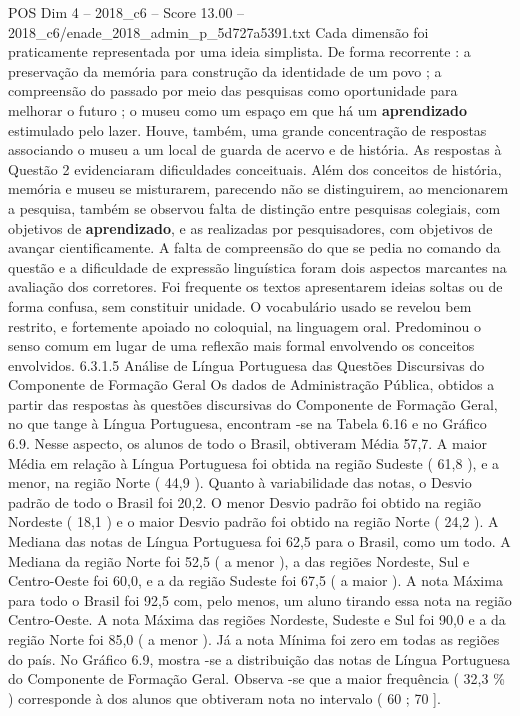 \begin{textsample}{POS Dim 4 – 2018\_c6 – Score 13.00 – 2018\_c6/enade\_2018\_admin\_p\_5d727a5391.txt}
Cada dimensão foi praticamente representada por uma ideia simplista.
De forma recorrente : a preservação da memória para construção da identidade de um povo ; a compreensão do passado por meio das pesquisas como oportunidade para melhorar o futuro ; o museu como um espaço em que há um \textbf{aprendizado} estimulado pelo lazer.
Houve, também, uma grande concentração de respostas associando o museu a um local de guarda de acervo e de história.
As respostas à Questão 2 evidenciaram dificuldades conceituais.
Além dos conceitos de história, memória e museu se misturarem, parecendo não se distinguirem, ao mencionarem a pesquisa, também se observou falta de distinção entre pesquisas colegiais, com objetivos de \textbf{aprendizado}, e as realizadas por pesquisadores, com objetivos de avançar cientificamente.
A falta de compreensão do que se pedia no comando da questão e a dificuldade de expressão linguística foram dois aspectos marcantes na avaliação dos corretores.
Foi frequente os textos apresentarem ideias soltas ou de forma confusa, sem constituir unidade.
O vocabulário usado se revelou bem restrito, e fortemente apoiado no coloquial, na linguagem oral.
Predominou o senso comum em lugar de uma reflexão mais formal envolvendo os conceitos envolvidos. 6.3.1.5 Análise de Língua Portuguesa das Questões Discursivas do Componente de Formação Geral Os dados de Administração Pública, obtidos a partir das respostas às questões discursivas do Componente de Formação Geral, no que tange à Língua Portuguesa, encontram -se na Tabela 6.16 e no Gráfico 6.9.
Nesse aspecto, os alunos de todo o Brasil, obtiveram Média 57,7.
A maior Média em relação à Língua Portuguesa foi obtida na região Sudeste ( 61,8 ), e a menor, na região Norte ( 44,9 ).
Quanto à variabilidade das notas, o Desvio padrão de todo o Brasil foi 20,2.
O menor Desvio padrão foi obtido na região Nordeste ( 18,1 ) e o maior Desvio padrão foi obtido na região Norte ( 24,2 ).
A Mediana das notas de Língua Portuguesa foi 62,5 para o Brasil, como um todo.
A Mediana da região Norte foi 52,5 ( a menor ), a das regiões Nordeste, Sul e Centro-Oeste foi 60,0, e a da região Sudeste foi 67,5 ( a maior ).
A nota Máxima para todo o Brasil foi 92,5 com, pelo menos, um aluno tirando essa nota na região Centro-Oeste.
A nota Máxima das regiões Nordeste, Sudeste e Sul foi 90,0 e a da região Norte foi 85,0 ( a menor ).
Já a nota Mínima foi zero em todas as regiões do país.
No Gráfico 6.9, mostra -se a distribuição das notas de Língua Portuguesa do Componente de Formação Geral.
Observa -se que a maior frequência ( 32,3 \% ) corresponde à dos alunos que obtiveram nota no intervalo ( 60 ; 70 ].

\end{textsample}
